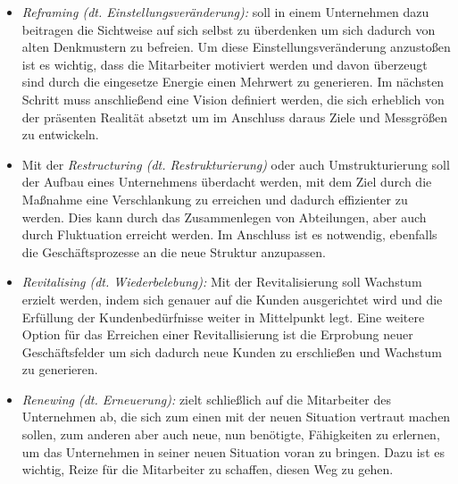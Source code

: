 \begin{itemize}
    \item[] \emph{Reframing (dt. Einstellungsveränderung):} soll in einem Unternehmen dazu beitragen die Sichtweise auf sich selbst zu überdenken um sich dadurch von alten Denkmustern zu befreien. Um diese Einstellungsveränderung anzustoßen ist es wichtig, dass die Mitarbeiter motiviert werden und davon überzeugt sind durch die eingesetze Energie einen Mehrwert zu generieren. Im nächsten Schritt muss anschließend eine Vision definiert werden, die sich erheblich von der präsenten Realität absetzt um im Anschluss daraus Ziele und Messgrößen zu entwickeln. 
    \item[] Mit der \emph{Restructuring (dt. Restrukturierung)} oder auch Umstrukturierung soll der Aufbau eines Unternehmens überdacht werden, mit dem Ziel durch die Maßnahme eine Verschlankung zu erreichen und dadurch effizienter zu werden. Dies kann durch das Zusammenlegen von Abteilungen, aber auch durch Fluktuation erreicht werden. Im Anschluss ist es notwendig, ebenfalls die Geschäftsprozesse an die neue Struktur anzupassen.   
    \item[] \emph{Revitalising (dt. Wiederbelebung):} Mit der Revitalisierung soll Wachstum erzielt werden, indem sich genauer auf die Kunden ausgerichtet wird und die Erfüllung der Kundenbedürfnisse weiter in Mittelpunkt legt. Eine weitere Option für das Erreichen einer Revitallisierung ist die Erprobung neuer Geschäftsfelder um sich dadurch neue Kunden zu erschließen und Wachstum zu generieren.
    \item[] \emph{Renewing (dt. Erneuerung):} zielt schließlich auf die Mitarbeiter des Unternehmen ab, die sich zum einen mit der neuen Situation vertraut machen sollen, zum anderen aber auch neue, nun benötigte, Fähigkeiten zu erlernen, um das Unternehmen in seiner neuen Situation voran zu bringen. Dazu ist es wichtig, Reize für die Mitarbeiter zu schaffen, diesen Weg zu gehen.
\end{itemize}

